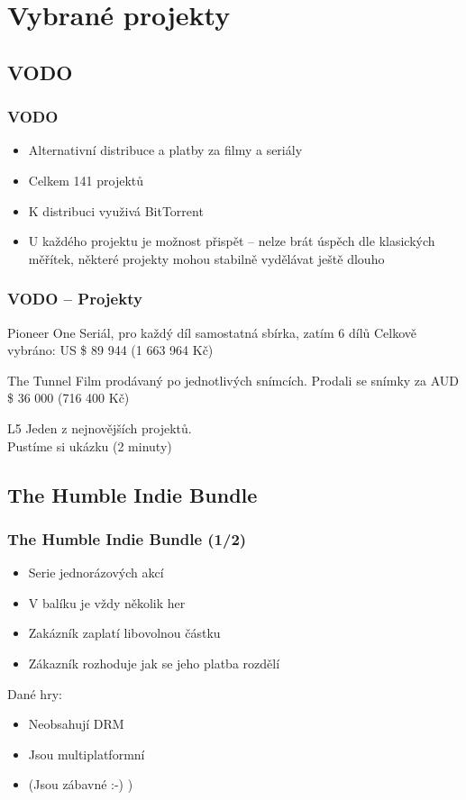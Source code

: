\documentclass[xetex]{beamer}
\begin{document}
\section{Vybrané projekty}
\subsection{VODO}
\begin{frame}
  \frametitle{VODO}
	\begin{itemize}
		\item Alternativní distribuce a platby za filmy a seriály
		\item Celkem 141 projektů	
		\item K distribuci využivá BitTorrent
		\item U každého projektu je možnost přispět -- nelze brát úspěch dle klasických měřítek, některé projekty mohou stabilně vydělávat ještě dlouho
	\end{itemize}
\end{frame}

\begin{frame}
\frametitle{VODO -- Projekty}
  \begin{block}{Pioneer One}
	Seriál, pro každý díl samostatná sbírka, zatím 6 dílů
	Celkově vybráno: US \$ 89 944 (1 663 964 Kč)
  \end{block}

  \begin{block}{The Tunnel}
	Film prodávaný po jednotlivých snímcích.
	Prodali se snímky za AUD \$ 36 000 (716 400 Kč)
  \end{block}

  \begin{block}{L5}
	Jeden z nejnovějších projektů.\\
	Pustíme si ukázku (2 minuty)
  \end{block}
\end{frame}

\subsection{The Humble Indie Bundle}

\begin{frame}
\frametitle{The Humble Indie Bundle (1/2)}
	\begin{itemize}
		\item Serie jednorázových akcí
		\item V balíku je vždy několik her
		\item Zakázník zaplatí libovolnou částku
		\item Zákazník rozhoduje jak se jeho platba rozdělí
	\end{itemize}

Dané hry:
	\begin{itemize}
		\item Neobsahují DRM
		\item Jsou multiplatformní 
		\item (Jsou zábavné :-) )
	\end{itemize}
\end{frame}
\end{document}
